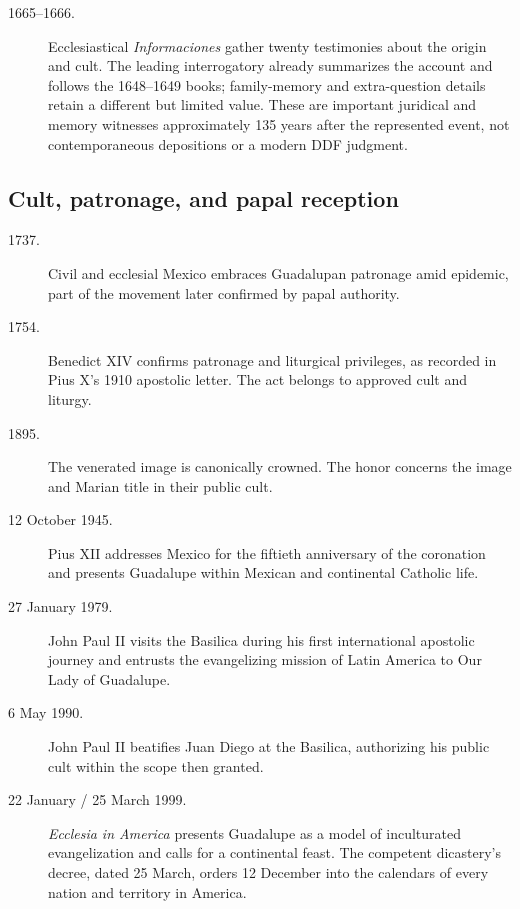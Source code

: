 \begin{description}
  \item[1665--1666.] Ecclesiastical \emph{Informaciones} gather twenty testimonies about the origin and cult. The leading interrogatory already summarizes the account and follows the 1648--1649 books; family-memory and extra-question details retain a different but limited value. These are important juridical and memory witnesses approximately 135 years after the represented event, not contemporaneous depositions or a modern DDF judgment.
\end{description}

\subsection{Cult, patronage, and papal reception}

\begin{description}
  \item[1737.] Civil and ecclesial Mexico embraces Guadalupan patronage amid epidemic, part of the movement later confirmed by papal authority.

  \item[1754.] Benedict XIV confirms patronage and liturgical privileges, as recorded in Pius X's 1910 apostolic letter. The act belongs to approved cult and liturgy.

  \item[1895.] The venerated image is canonically crowned. The honor concerns the image and Marian title in their public cult.

  \item[12 October 1945.] Pius XII addresses Mexico for the fiftieth anniversary of the coronation and presents Guadalupe within Mexican and continental Catholic life.

  \item[27 January 1979.] John Paul II visits the Basilica during his first international apostolic journey and entrusts the evangelizing mission of Latin America to Our Lady of Guadalupe.

  \item[6 May 1990.] John Paul II beatifies Juan Diego at the Basilica, authorizing his public cult within the scope then granted.

  \item[22 January / 25 March 1999.] \emph{Ecclesia in America} presents Guadalupe as a model of inculturated evangelization and calls for a continental feast. The competent dicastery's decree, dated 25 March, orders 12 December into the calendars of every nation and territory in America.


\end{description}
